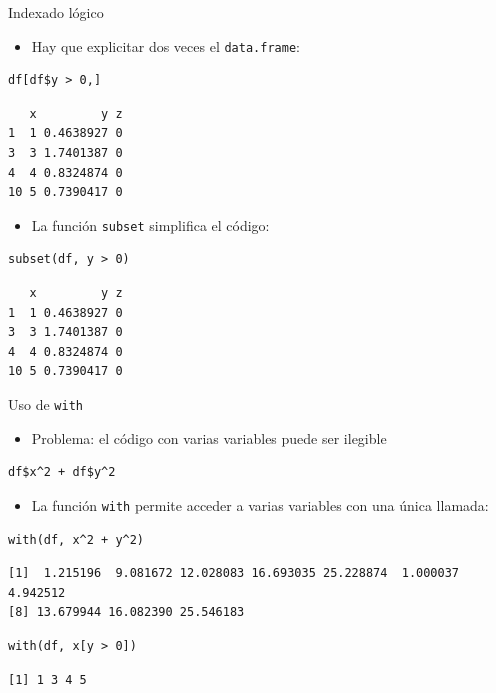 \documentclass[xcolor={usenames,svgnames,dvipsnames}]{beamer}
\begin{document}
\begin{frame}[fragile,label={sec:orgc13df22}]{Indexado lógico}
 \begin{itemize}
\item Hay que explicitar dos veces el \texttt{data.frame}:
\end{itemize}
\lstset{language=r,label= ,caption= ,captionpos=b,numbers=none}
\begin{lstlisting}
df[df$y > 0,]
\end{lstlisting}

\begin{verbatim}
   x         y z
1  1 0.4638927 0
3  3 1.7401387 0
4  4 0.8324874 0
10 5 0.7390417 0
\end{verbatim}

\begin{itemize}
\item La función \texttt{subset} simplifica el código:
\end{itemize}
\lstset{language=r,label= ,caption= ,captionpos=b,numbers=none}
\begin{lstlisting}
subset(df, y > 0)
\end{lstlisting}

\begin{verbatim}
   x         y z
1  1 0.4638927 0
3  3 1.7401387 0
4  4 0.8324874 0
10 5 0.7390417 0
\end{verbatim}
\end{frame}

\begin{frame}[fragile,label={sec:org6a2203e}]{Uso de \texttt{with}}
 \begin{itemize}
\item Problema: el código con varias variables puede ser ilegible
\end{itemize}
\lstset{language=r,label= ,caption= ,captionpos=b,numbers=none}
\begin{lstlisting}
df$x^2 + df$y^2
\end{lstlisting}
\begin{itemize}
\item La función \texttt{with} permite acceder a varias variables con una única llamada:
\end{itemize}
\lstset{language=r,label= ,caption= ,captionpos=b,numbers=none}
\begin{lstlisting}
with(df, x^2 + y^2)
\end{lstlisting}

\begin{verbatim}
[1]  1.215196  9.081672 12.028083 16.693035 25.228874  1.000037  4.942512
[8] 13.679944 16.082390 25.546183
\end{verbatim}

\lstset{language=r,label= ,caption= ,captionpos=b,numbers=none}
\begin{lstlisting}
with(df, x[y > 0])
\end{lstlisting}

\begin{verbatim}
[1] 1 3 4 5
\end{verbatim}
\end{frame}
\end{document}
